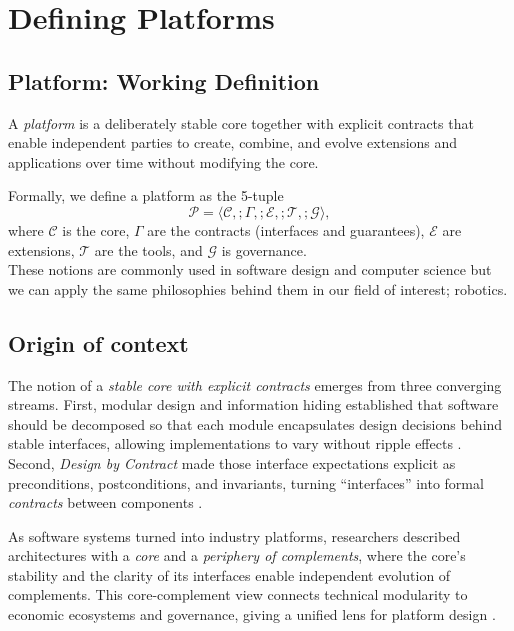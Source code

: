 \chapter{Defining Platforms}\label{chap\:defining-platforms}
\section{Platform: Working Definition}\label{sec\:platform-definition}
A \emph{platform} is a deliberately stable core together with explicit contracts that enable independent parties to create, combine, and evolve extensions and applications over time without modifying the core.

Formally, we define a platform as the 5-tuple
\begin{equation}
\mathcal{P} = \langle \mathcal{C},; \Gamma,; \mathcal{E},; \mathcal{T},; \mathcal{G} \rangle,
\end{equation}
where $\mathcal{C}$ is the core, $\Gamma$ are the contracts (interfaces and guarantees), $\mathcal{E}$ are extensions, $\mathcal{T}$ are the tools, and $\mathcal{G}$ is governance.\\

These notions are commonly used in software design and computer science but we can apply the same philosophies behind them in our field of interest; robotics. 

\section{Origin of context}

The notion of a \emph{stable core with explicit contracts} emerges from three converging streams. First, modular design and information hiding established that software should be decomposed so that each module encapsulates design decisions behind stable interfaces, allowing implementations to vary without ripple effects \cite{parnas1972}. Second, \emph{Design by Contract} made those interface expectations explicit as preconditions, postconditions, and invariants, turning ``interfaces'' into formal \emph{contracts} between components \cite{meyer1992}. 

As software systems turned into industry platforms, researchers described architectures with a \emph{core} and a \emph{periphery of complements}, where the core's stability and the clarity of its interfaces enable independent evolution of complements. This core-complement view connects technical modularity to economic ecosystems and governance, giving a unified lens for platform design \cite{baldwin2009platforms}. 


